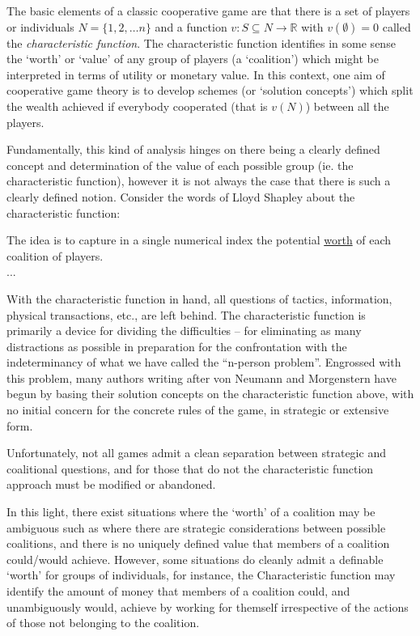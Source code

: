 The basic elements of a classic cooperative game are that there is a set of players or individuals $N=\{1,2,\dots n\}$ and a function $v: S\subseteq N \rightarrow \mathbb{R}$ with $v(\emptyset)=0$ called the \textit{characteristic function}.
The characteristic function identifies in some sense the `worth' or `value' of any group of players (a `coalition') which might be interpreted in terms of utility or monetary value.
In this context, one aim of cooperative game theory is to develop schemes (or `solution concepts') which split the wealth achieved if everybody cooperated (that is $v(N)$) between all the players.

Fundamentally, this kind of analysis hinges on there being a clearly defined concept and determination of the value of each possible group (ie. the characteristic function), however it is not always the case that there is such a clearly defined notion.
Consider the words of Lloyd Shapley about the characteristic function:

\begin{displayquote}
The idea is to capture in a single numerical index the potential \underline{worth} of each coalition of players.\\
...

With the characteristic function in hand, all questions of tactics, information, physical transactions, etc., are left behind. The characteristic function is primarily a device for dividing the difficulties -- for eliminating as many distractions as possible in preparation for the confrontation with the indeterminancy of what we have called the ``n-person problem''. Engrossed with this problem, many authors writing after von Neumann and Morgenstern have begun by basing their solution concepts on the characteristic function above, with no initial concern for the concrete rules of the game, in strategic or extensive form.

Unfortunately, not all games admit a clean separation between strategic and coalitional questions, and for those that do not the characteristic function approach must be modified or abandoned.\cite{ShapleySchubikCharacteristicFunction}
\end{displayquote}

In this light, there exist situations where the `worth' of a coalition may be ambiguous such as where there are strategic considerations between possible coalitions, and there is no uniquely defined value that members of a coalition could/would achieve.
However, some situations do cleanly admit a definable `worth' for groups of individuals, for instance, the Characteristic function may identify the amount of money that members of a coalition could, and unambiguously would, achieve by working for themself irrespective of the actions of those not belonging to the coalition.

